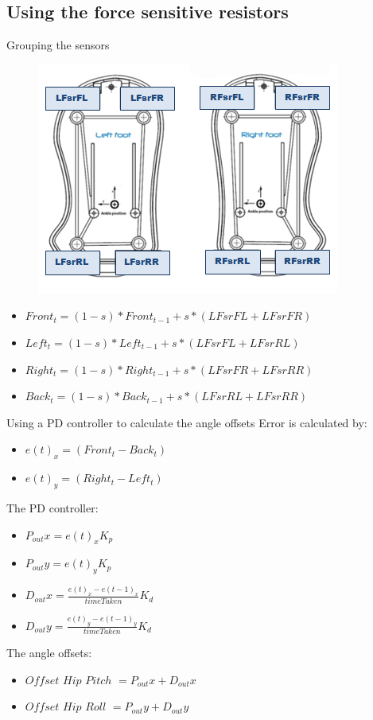 \documentclass{beamer}
\begin{document}
\subsection{Using the force sensitive resistors}
\begin{frame}{Grouping the sensors}
\begin{figure}[htb]
	\centering
	\includegraphics[scale=0.45]{pics/naosfeet.jpg}
	\label{fig:fsr_plot}
\end{figure}
\begin{itemize}
    \item $Front_t = (1-s) * Front_{t-1} + s * (LFsrFL + LFsrFR)$
    \item $Left_t = (1-s) * Left_{t-1} + s *(LFsrFL + LFsrRL)$
    \item $Right_t = (1-s) * Right_{t-1} + s *(LFsrFR + LFsrRR)$
    \item $Back_t = (1-s) * Back_{t-1} + s *(LFsrRL + LFsrRR)$ 
\end{itemize}
\end{frame}

\begin{frame}{Using a PD controller to calculate the angle offsets}
Error is calculated by:
\begin{itemize}
    \item $e(t)_x = (Front_t - Back_t)$
    \item $e(t)_y = (Right_t - Left_t)$
\end{itemize}
The PD controller:
\begin{itemize}
    \item $P_{out} x = e(t)_xK_p$
    \item $P_{out} y = e(t)_yK_p$
    \item $D_{out} x = \frac{e(t)_x - e(t-1)_x}{timeTaken}K_d$
    \item $D_{out} y = \frac{e(t)_y - e(t-1)_y}{timeTaken}K_d$
\end{itemize}
The angle offsets:
\begin{itemize}
    \item  $Offset$ $Hip$ $Pitch$ $= P_{out}x + D_{out}x$ 
    \item $Offset$ $Hip$ $Roll$ $=  P_{out}y + D_{out}y$ 
\end{itemize}
\end{frame}
\end{document}
